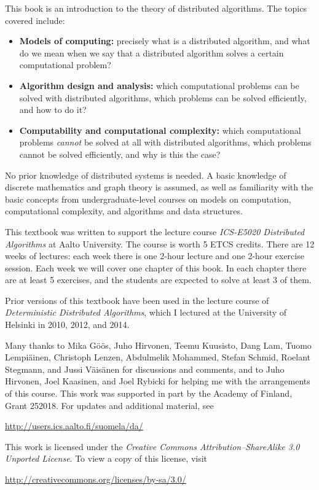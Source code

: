 
This book is an introduction to the theory of distributed algorithms. The topics covered include:
\begin{itemize}
    \item \textbf{Models of computing:} precisely what is a distributed algorithm, and what do we mean when we say that a distributed algorithm solves a certain computational problem?
    \item \textbf{Algorithm design and analysis:} which computational problems can be solved with distributed algorithms, which problems can be solved efficiently, and how to do it?
    \item \textbf{Computability and computational complexity:} which computational problems \emph{cannot} be solved at all with distributed algorithms, which problems cannot be solved efficiently, and why is this the case?
\end{itemize}
No prior knowledge of distributed systems is needed. A basic knowledge of discrete mathematics and graph theory is assumed, as well as familiarity with the basic concepts from undergraduate-level courses on models on computation, computational complexity, and algorithms and data structures.



This textbook was written to support the lecture course \emph{ICS-E5020 Distributed Algorithms} at Aalto University. The course is worth 5 ETCS credits. There are 12 weeks of lectures: each week there is one 2-hour lecture and one 2-hour exercise session. Each week we will cover one chapter of this book. In each chapter there are at least 5 exercises, and the students are expected to solve at least 3 of them.

Prior versions of this textbook have been used in the lecture course of \emph{Deterministic Distributed Algorithms}, which I lectured at the University of Helsinki in 2010, 2012, and 2014.



Many thanks to Mika G\"o\"os, Juho Hirvonen, Tee\-mu Kuu\-sisto, Dang Lam, Tuo\-mo Lem\-pi\"a\-inen, Christoph Lenzen, Abdulmelik Mohammed, Stefan Schmid, Roelant Stegmann, and Jussi V\"ai\-s\"a\-nen for discussions and comments, and to Juho Hirvonen, Joel Kaasinen, and Joel Rybicki for helping me with the arrangements of this course. This work was supported in part by the Academy of Finland, Grant 252018. For updates and additional material, see
\begin{center}
    \url{http://users.ics.aalto.fi/suomela/da/}
\end{center}



\begin{samepage}
This work is licensed under the \emph{Creative Commons Attribution--ShareAlike 3.0 Unported License}. To view a copy of this license, visit
\begin{center}
    \url{http://creativecommons.org/licenses/by-sa/3.0/}
\end{center}
\end{samepage}
